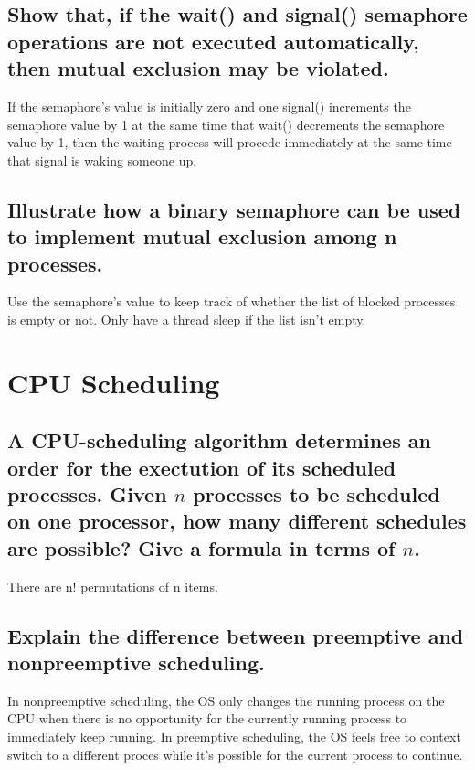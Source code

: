 \documentclass{book}%
\begin{document}
\section{Show that, if the wait() and signal() semaphore operations are not executed automatically, then mutual exclusion may be violated.}
If the semaphore's value is initially zero and one signal() increments the semaphore value by 1 at the same time that wait() decrements the semaphore value by 1, then the waiting process will procede immediately at the same time that signal is waking someone up.
\section{Illustrate how a binary semaphore can be used to implement mutual exclusion among n processes.}
Use the semaphore's value to keep track of whether the list of blocked processes is empty or not. Only have a thread sleep if the list isn't empty.
\chapter{CPU Scheduling}
\section{A CPU-scheduling algorithm determines an order for the exectution of its scheduled processes. Given $n$ processes to be scheduled on one processor, how many different schedules are possible? Give a formula in terms of $n$.}
There are n! permutations of n items.
\section{Explain the difference between preemptive and nonpreemptive scheduling.}
In nonpreemptive scheduling, the OS only changes the running process on the CPU when there is no opportunity for the currently running process to immediately keep running. In preemptive scheduling, the OS feels free to context switch to a different proces while it's possible for the current process to continue.
\end{document}
